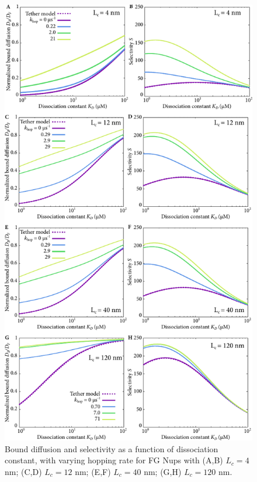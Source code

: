 \begin{figure}
\centering
\includegraphics[width=0.7\linewidth]{figs/ch02/hopping_lc4-fig.pdf}
\caption[Effect of Nup contour length and hopping rate on selectivity.]{Bound diffusion and selectivity as a function of dissociation
  constant, with varying hopping rate for FG Nups with (A,B) $L_c = 4$ nm; (C,D) $L_c = 12$ nm; (E,F) $L_c = 40$ nm; (G,H) $L_c = 120$ nm.}
\label{fig:hop-results}
\end{figure}

